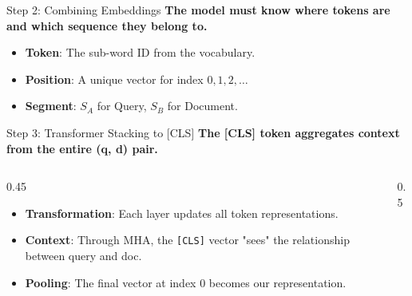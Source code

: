 \documentclass[aspectratio=169]{beamer}
\newif\ifanimated
\newcommand{\cpause}{\ifanimated\pause\fi}
\begin{document}
\begin{frame}{Step 2: Combining Embeddings}
\textbf{The model must know where tokens are and which sequence they belong to.}

\vspace{1em}
\begin{center}

\end{center}

\vspace{0.5em}
\cpause
\begin{itemize}
    \item \textbf{Token}: The sub-word ID from the vocabulary.
    \item \textbf{Position}: A unique vector for index $0, 1, 2, \ldots$
    \item \textbf{Segment}: $S_A$ for Query, $S_B$ for Document.
\end{itemize}
\end{frame}

\begin{frame}{Step 3: Transformer Stacking to [CLS]}
\textbf{The [CLS] token aggregates context from the entire (q, d) pair.}

\vspace{0.8em}
\begin{columns}
\begin{column}{0.45\textwidth}
\begin{itemize}
    \item \textbf{Transformation}: Each layer updates all token representations.
    \item \textbf{Context}: Through MHA, the \texttt{[CLS]} vector "sees" the relationship between query and doc.
    \item \textbf{Pooling}: The final vector at index 0 becomes our representation.
\end{itemize}
\end{column}

\begin{column}{0.5\textwidth}
\begin{center}

\end{center}
\end{column}
\end{columns}
\end{frame}
\end{document}
